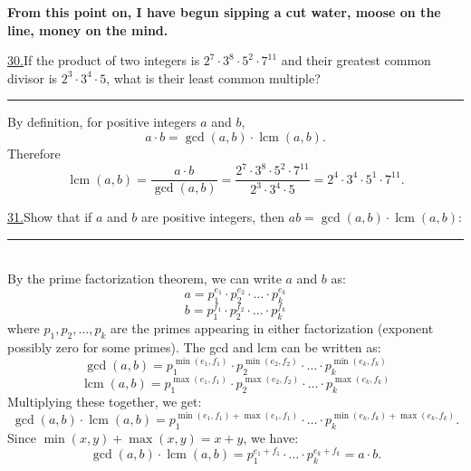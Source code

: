 \documentclass[12pt]{article}
\DeclareMathOperator{\lcm}{lcm}
\begin{document}
\vspace{15mm}
\textbf{From this point on, I have begun sipping a cut water, moose on the line, money on the mind.}


\noindent\underline{30.}If the product of two integers is $2^7\cdot 3^8 \cdot 5^2 \cdot 7^{11}$ and their greatest common divisor is $2^3 \cdot 3^4 \cdot 5$, what is their least common multiple?
 \\ \rule{\linewidth}{0.5pt}
By definition, for positive integers $a$ and $b$,
\[
a \cdot b = \gcd(a,b) \cdot \lcm(a,b).
\]
Therefore
\[
\lcm(a,b) = \frac{a \cdot b}{\gcd(a,b)} = \frac{2^7\cdot 3^8 \cdot 5^2 \cdot 7^{11}}{2^3 \cdot 3^4 \cdot 5} = 2^{4} \cdot 3^{4} \cdot 5^{1} \cdot 7^{11}.
\]

\vspace{5mm}

\noindent\underline{31.}Show that if $a$ and $b$ are positive integers, then $ab=\gcd(a,b) \cdot \lcm(a,b)$:
\\ \rule{\linewidth}{0.5pt}
\\\indent By the prime factorization theorem, we can write $a$ and $b$ as:
\[a = p_1^{e_1} \cdot p_2^{e_2} \cdot \dots \cdot p_k^{e_k}\]
\[b = p_1^{f_1} \cdot p_2^{f_2} \cdot \dots \cdot p_k^{f_k}\]
where $p_1, p_2, \dots, p_k$ are the primes appearing in either factorization (exponent possibly zero for some primes).
The gcd and lcm can be written as:
\[\gcd(a,b) = p_1^{\min(e_1,f_1)} \cdot p_2^{\min(e_2,f_2)} \cdot \dots \cdot p_k^{\min(e_k,f_k)}\]
\[\lcm(a,b) = p_1^{\max(e_1,f_1)} \cdot p_2^{\max(e_2,f_2)} \cdot \dots \cdot p_k^{\max(e_k,f_k)}\]
Multiplying these together, we get:
\[
 \gcd(a,b) \cdot \lcm(a,b) = p_1^{\min(e_1,f_1) + \max(e_1,f_1)} \cdot \dots \cdot p_k^{\min(e_k,f_k) + \max(e_k,f_k)}.
\]
Since $\min(x,y) + \max(x,y) = x + y$, we have:
\[
 \gcd(a,b) \cdot \lcm(a,b) = p_1^{e_1 + f_1} \cdot \dots \cdot p_k^{e_k + f_k} = a \cdot b.
\]
\end{document}
